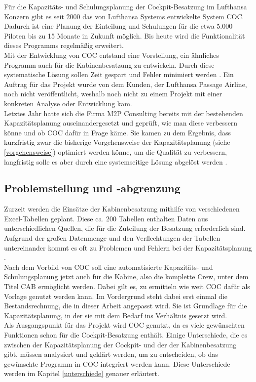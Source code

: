 \documentclass [12pt, a4paper, oneside, titlepage, ngerman]{article}
\begin{document}
\noindent Für die Kapazitäts- und Schulungsplanung der Cockpit-Besatzung im Lufthansa Konzern gibt es seit 2000 das von Lufthansa Systems entwickelte System \ac{COC}. Dadurch ist eine Planung der Einteilung und Schulungen für die etwa 5.000 Piloten bis zu 15 Monate in Zukunft möglich. Bis heute wird die Funktionalität dieses Programms regelmäßig erweitert.  \\
Mit der Entwicklung von \ac{COC} entstand eine Vorstellung, ein ähnliches Programm auch für die Kabinenbesatzung zu entwickeln. Durch diese systematische Lösung sollen Zeit gespart und Fehler minimiert werden \cite[vgl.][S.4]{highlevelitems}. Ein Auftrag für das Projekt wurde von dem Kunden, der Lufthansa Passage Airline, noch nicht veröffentlicht, weshalb noch nicht zu einem Projekt mit einer konkreten Analyse oder Entwicklung kam.  \\

\noindent Letztes Jahr hatte sich die Firma M2P Consulting bereits mit der bestehenden Kapazitätsplanung auseinandergesetzt und geprüft, wie man diese verbessern könne und ob \ac{COC} dafür in Frage käme. Sie kamen zu dem Ergebnis, dass kurzfristig zwar die bisherige Vorgehensweise der Kapazitätsplanung (siehe \ref{vorgehensweise}) optimiert werden könne, um die Qualität zu verbessern, langfristig solle es aber durch eine systemseitige Lösung abgelöst werden \cite [vgl.][S.8-10]{M2P}. %

\subsection {Problemstellung und -abgrenzung}
Zurzeit werden die Einsätze der Kabinenbesatzung mithilfe von verschiedenen Excel-Tabellen geplant. Diese ca. 200 Tabellen enthalten Daten aus unterschiedlichen Quellen, die für die Zuteilung der Besatzung erforderlich sind. Aufgrund der großen Datenmenge und den Verflechtungen der Tabellen untereinander kommt es oft zu Problemen und Fehlern bei der Kapazitätsplanung \cite[vgl.][]{Gespraech2}. \\ 

\noindent Nach dem Vorbild von \ac{COC} soll eine automatisierte Kapazitäts- und Schulungsplanung jetzt auch für die Kabine, also die komplette Crew, unter dem Titel \ac{CAB} ermöglicht werden. Dabei gilt es, zu ermitteln wie weit \ac{COC} dafür als Vorlage genutzt werden kann.  Im Vordergrund steht dabei erst einmal die Bestandsrechnung, die in dieser Arbeit angepasst wird. Sie ist Grundlage für die Kapazitätsplanung, in der sie mit dem Bedarf ins Verhältnis gesetzt wird.\\ %
Als Ausgangspunkt für das Projekt wird \ac{COC} genutzt, da es viele gewünschten Funktionen schon für die Cockpit-Besatzung enthält. Einige Unterschiede, die es zwischen der Kapazitätsplanung der Cockpit- und der der Kabinenbesatzung gibt, müssen analysiert und geklärt werden, um zu entscheiden, ob das gewünschte Programm in \ac{COC} integriert werden kann. Diese Unterschiede werden im Kapitel \ref{unterschiede} genauer erläutert. %
\\
\end{document}
